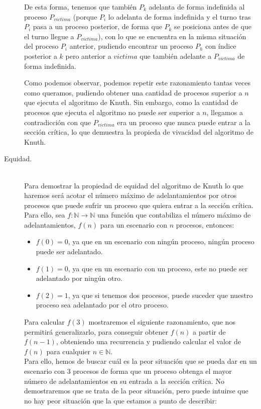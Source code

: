 \begin{description}
        De esta forma, tenemos que también $P_k$ adelanta de forma indefinida al proceso $P_{victima}$ (porque $P_i$ lo adelanta de forma indefinida y el turno tras $P_i$ pasa a un proceso posterior, de forma que $P_k$ se posiciona antes de que el turno llegue a $P_{victima}$), con lo que se encuentra en la misma situación del proceso $P_i$ anterior, pudiendo encontrar un proceso $P_h$ con índice posterior a $k$ pero anterior a $victima$ que también adelante a $P_{victima}$ de forma indefinida.

        Como podemos observar, podemos repetir este razonamiento tantas veces como queramos, pudiendo obtener una cantidad de procesos superior a $n$ que ejecuta el algoritmo de Knuth. Sin embargo, como la cantidad de procesos que ejecuta el algoritmo no puede ser superior a $n$, llegamos a contradicción con que $P_{victima}$ era un proceso que nunca puede entrar a la sección crítica, lo que demuestra la propieda de vivacidad del algoritmo de Knuth.
    \item [Equidad.]~\\
        Para demostrar la propiedad de equidad del algoritmo de Knuth lo que haremos será acotar el número máximo de adelantamientos por otros procesos que puede sufrir un proceso que quiera entrar a la sección crítica. Para ello, sea $f:\mathbb{N}\rightarrow\mathbb{N}$ una función que contabiliza el número máximo de adelantamientos, $f(n)$ para un escenario con $n$ procesos, entonces:
        \begin{itemize}
            \item $f(0) = 0$, ya que en un escenario con ningún proceso, ningún proceso puede ser adelantado.
            \item $f(1) = 0$, ya que en un escenario con un proceso, este no puede ser adelantado por ningún otro.
            \item $f(2) = 1$, ya que si tenemos dos procesos, puede suceder que nuestro proceso sea adelantado por el otro proceso.
        \end{itemize}
        Para calcular $f(3)$ mostraremos el siguiente razonamiento, que nos permitirá generalizarlo, para conseguir obtener $f(n)$ a partir de $f(n-1)$, obteniendo una recurrencia y pudiendo calcular el valor de $f(n)$ para cualquier $n\in \mathbb{N}$.\\

        Para ello, hemos de buscar cuál es la peor situación que se pueda dar en un escenario con 3 procesos de forma que un proceso obtenga el mayor número de adelantamientos en su entrada a la sección crítica. No demostraremos que se trata de la peor situación, pero puede intuirse que no hay peor situación que la que estamos a punto de describir:


\end{description}
